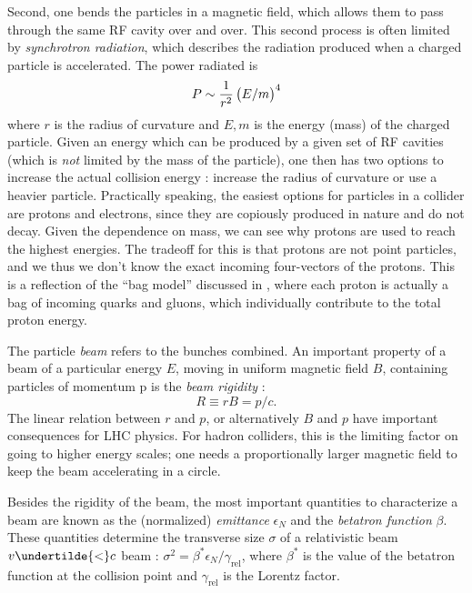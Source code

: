 Second, one bends the particles in a magnetic field, which allows them to pass through the same RF cavity over and over.
This second process is often limited by \textit{synchrotron radiation}, which describes the radiation produced when a charged particle is accelerated.
The power radiated is
\begin{equation}
P \sim \frac{1}{r^2} \begin{pmatrix} E/m \end{pmatrix}^4
\end{equation}
where $r$ is the radius of curvature and $E,m$ is the energy (mass) of the charged particle.
Given an energy which can be produced by a given set of RF cavities (which is \textit{not} limited by the mass of the particle), one then has two options to increase the actual collision energy : increase the radius of curvature or use a heavier particle.
Practically speaking, the easiest options for particles in a collider are protons and electrons, since they are copiously produced in nature and do not decay\footnotemark.
Given the dependence on mass, we can see why protons are used to reach the highest energies.
The tradeoff for this is that protons are not point particles, and we thus we don't know the exact incoming four-vectors of the protons.
This is a reflection of the ``bag model'' discussed in , where each proton is actually a bag of incoming quarks and gluons, which individually contribute to the total proton energy.

The particle \textit{beam} refers to the bunches combined.
An important property of a beam of a particular energy $E$, moving in uniform magnetic field $B$, containing particles of momentum p is the \textit{beam rigidity} :
\begin{equation}\label{eq:rigidity}
R \equiv r B = p / c.
\end{equation}
The linear relation between $r$ and $p$, or alternatively $B$ and $p$ have important consequences for LHC physics.
For hadron colliders, this is the limiting factor on going to higher energy scales; one needs a proportionally larger magnetic field to keep the beam accelerating in a circle.

Besides the rigidity of the beam, the most important quantities to characterize a beam are known as the (normalized) \textit{emittance} $\epsilon_N$ and the \textit{betatron function} $\beta$.
These quantities determine the transverse size $\sigma$ of a relativistic beam $v \undertilde{<} c$ beam : $\sigma^2 = \beta^* \epsilon_N / \gamma_{\text{rel}}$, where $\beta^*$ is the value of the betatron function at the collision point and $\gamma_{\text{rel}}$ is the Lorentz factor.

